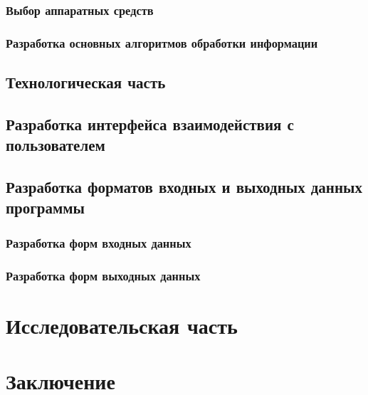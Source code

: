 \documentclass[russian,utf8,emptystyle]{eskdtext}
\begin{document}
\subsubsection{Выбор аппаратных средств}

\subsubsection{Разработка основных алгоритмов обработки информации}

\newpage
\subsection{Технологическая часть}
\subsection{Разработка интерфейса взаимодействия с пользователем}

\subsection{Разработка форматов входных и выходных данных программы}
\subsubsection{Разработка форм входных данных}

\subsubsection{Разработка форм выходных данных}

\newpage
\section{Исследовательская часть}

\newpage
\section{Заключение}

\newpage
\end{document}
